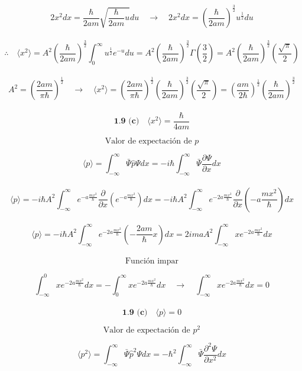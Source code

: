 \documentclass[10pt,a4papper]{article}
\begin{document}
\[2x^2dx=\frac{\hbar}{2am}\sqrt{\frac{\hbar}{2am}u}du\quad\to\quad 2x^2dx=\left(\frac{\hbar}{2am}\right)^\frac{3}{2}u^\frac{1}{2}du\]\\

\[\therefore\quad\langle x^2\rangle=
A^2\left(\frac{\hbar}{2am}\right)^\frac{3}{2}\int_0^\infty u^\frac{1}{2}e^{-u}du=
A^2\left(\frac{\hbar}{2am}\right)^\frac{3}{2}\Gamma\left(\frac{3}{2}\right)=
A^2\left(\frac{\hbar}{2am}\right)^\frac{3}{2}\left(\frac{\sqrt{\pi}}{2}\right)\]\\

\[A^2=\left(\frac{2am}{\pi\hbar}\right)^\frac{1}{2}\quad\to\quad
\langle x^2\rangle=
\left(\frac{2am}{\pi\hbar}\right)^\frac{1}{2}\left(\frac{\hbar}{2am}\right)^\frac{3}{2}\left(\frac{\sqrt{\pi}}{2}\right)=
\left(\frac{am}{2\hbar}\right)^\frac{1}{2}\left(\frac{\hbar}{2am}\right)^\frac{3}{2}\]\\

\[\boxed{\textbf{1.9 (c)}\quad\langle x^2\rangle=\frac{\hbar}{4am}}\]

\newpage
\[\text{Valor de expectación de }p\]

\[\langle p\rangle=
\int_{-\infty}^\infty \bar\Psi\hat p\Psi dx=
-i\hbar\int_{-\infty}^\infty\bar\Psi\frac{\partial\Psi}{\partial x}dx\]\\

\[\langle p\rangle=
-i\hbar A^2\int_{-\infty}^\infty e^{-a\frac{mx^2}{\hbar}}\frac{\partial}{\partial x}\left(e^{-a\frac{mx^2}{\hbar}}\right)dx=
-i\hbar A^2\int_{-\infty}^\infty e^{-2a\frac{mx^2}{\hbar}}\frac{\partial}{\partial x}\left(-a\frac{mx^2}{\hbar}\right)dx\]\\

\[\langle p\rangle=
-i\hbar A^2\int_{-\infty}^\infty e^{-2a\frac{mx^2}{\hbar}}\left(-\frac{2am}{\hbar}x\right)dx=
2imaA^2\int_{-\infty}^\infty xe^{-2a\frac{mx^2}{\hbar}}dx\]\\

\[\text{Función impar}\]

\[\int_{-\infty}^0 xe^{-2a\frac{mx^2}{\hbar}}dx=-\int_0^\infty xe^{-2a\frac{mx^2}{\hbar}}dx\quad\to\quad
\int_{-\infty}^\infty xe^{-2a\frac{mx^2}{\hbar}}dx=0\]\\

\[\boxed{\textbf{1.9 (c)}\quad\langle p\rangle=0}\]

\newpage
\[\text{Valor de expectación de }p^2\]

\[\langle p^2\rangle=
\int_{-\infty}^\infty \bar\Psi\hat p^2\Psi dx=
-\hbar^2\int_{-\infty}^\infty\bar\Psi\frac{\partial^2\Psi}{\partial x^2}dx\]\\
\end{document}
